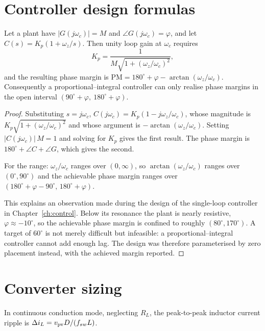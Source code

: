 \section{Controller design formulas}

\begin{proposition}
\label{prop:pi}
Let a plant have $|G(j\omega_c)| = M$ and $\angle G(j\omega_c) = \varphi$, and
let $C(s) = K_p(1 + \omega_z/s)$. Then unity loop gain at $\omega_c$ requires
\[
K_p = \frac{1}{M\sqrt{1 + (\omega_z/\omega_c)^2}},
\]
and the resulting phase margin is
$\mathrm{PM} = 180^\circ + \varphi - \arctan(\omega_z/\omega_c)$. Consequently
a proportional--integral controller can only realise phase margins in the open
interval $(90^\circ + \varphi,\ 180^\circ + \varphi)$.
\end{proposition}

\begin{proof}
Substituting $s = j\omega_c$,
$C(j\omega_c) = K_p\left(1 - j\omega_z/\omega_c\right)$, whose magnitude is
$K_p\sqrt{1 + (\omega_z/\omega_c)^2}$ and whose argument is
$-\arctan(\omega_z/\omega_c)$. Setting $|C(j\omega_c)|\,M = 1$ and solving for
$K_p$ gives the first result. The phase margin is
$180^\circ + \angle C + \angle G$, which gives the second.

For the range: $\omega_z/\omega_c$ ranges over $(0,\infty)$, so
$\arctan(\omega_z/\omega_c)$ ranges over $(0^\circ, 90^\circ)$ and the
achievable phase margin ranges over $(180^\circ + \varphi - 90^\circ,\,
180^\circ + \varphi)$.

This explains an observation made during the design of the single-loop
controller in Chapter~\ref{ch:control}. Below its resonance the plant is nearly
resistive, $\varphi \approx -10^\circ$, so the achievable phase margin is
confined to roughly $(80^\circ, 170^\circ)$. A target of $60^\circ$ is not
merely difficult but infeasible: a proportional--integral controller cannot add
enough lag. The design was therefore parameterised by zero placement instead,
with the achieved margin reported.
\end{proof}

\section{Converter sizing}

\begin{proposition}
\label{prop:iripple}
In continuous conduction mode, neglecting $R_L$, the peak-to-peak inductor
current ripple is $\Delta i_L = v_{\mathrm{pv}} D/(f_{sw}L)$.
\end{proposition}

